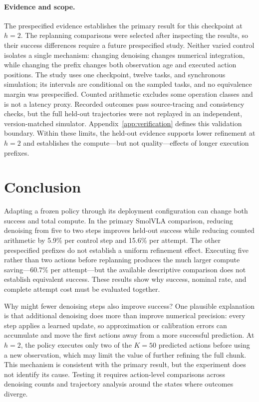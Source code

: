 \documentclass{article}
\begin{document}
\paragraph{Evidence and scope.}
The prespecified evidence establishes the primary result for this checkpoint at
$h=2$. The replanning comparisons were selected after inspecting the results,
so their success differences require a future prespecified study. Neither varied
control isolates a single mechanism: changing denoising changes numerical
integration, while changing the prefix changes both observation age and executed
action positions. The study uses one checkpoint, twelve tasks, and synchronous
simulation; its intervals are conditional on the sampled tasks, and no
equivalence margin was prespecified. Counted arithmetic excludes some operation
classes and is not a latency proxy. Recorded outcomes pass source-tracing and
consistency checks, but the full held-out trajectories were not replayed in an
independent, version-matched simulator. Appendix~\ref{app:verification} defines
this validation boundary. Within these limits, the held-out evidence supports
lower refinement at $h=2$ and establishes the compute---but not quality---effects
of longer execution prefixes.

\FloatBarrier
\flushbottom
\section{Conclusion}

Adapting a frozen policy through its deployment configuration can change both
success and total compute. In the primary SmolVLA comparison, reducing
denoising from five to two steps improves held-out success while reducing
counted arithmetic by 5.9\% per control step and 15.6\% per attempt. The other
prespecified prefixes do not establish a uniform refinement effect. Executing
five rather than two actions before replanning produces the much larger compute
saving---60.7\% per attempt---but the available descriptive comparison does not
establish equivalent success. These results show why success, nominal rate, and
complete attempt cost must be evaluated together.

Why might fewer denoising steps also improve success? One plausible explanation
is that additional denoising does more than improve numerical precision: every
step applies a learned update, so approximation or calibration errors can
accumulate and move the first actions away from a more successful prediction.
At $h=2$, the policy executes only two of the $K=50$ predicted actions before
using a new observation, which may limit the value of further refining the full
chunk. This mechanism is consistent with the primary result, but the experiment
does not identify its cause. Testing it requires action-level comparisons across
denoising counts and trajectory analysis around the states where outcomes
diverge.
\end{document}
